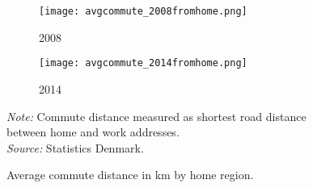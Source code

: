 \begin{figure}
\centering
\begin{minipage}{0.85\textwidth}
\begin{subfigure}{.50\textwidth}
  \centering
  \texttt{[image: avgcommute\_2008fromhome.png]}
  \caption{\footnotesize{2008}}
  \label{fig:sub1}
\end{subfigure}%
\begin{subfigure}{.50\textwidth}
  \centering
  \texttt{[image: avgcommute\_2014fromhome.png]}
  \caption{\footnotesize{2014}}
  \label{fig:sub2}
\end{subfigure}
{\tiny \emph{Note:} Commute distance measured as shortest road distance between home and work addresses. \\ \emph{Source:} Statistics Denmark.\par}
\end{minipage}
\caption{Average commute distance in km by home region.}
\label{fig:comhome}
\end{figure}

